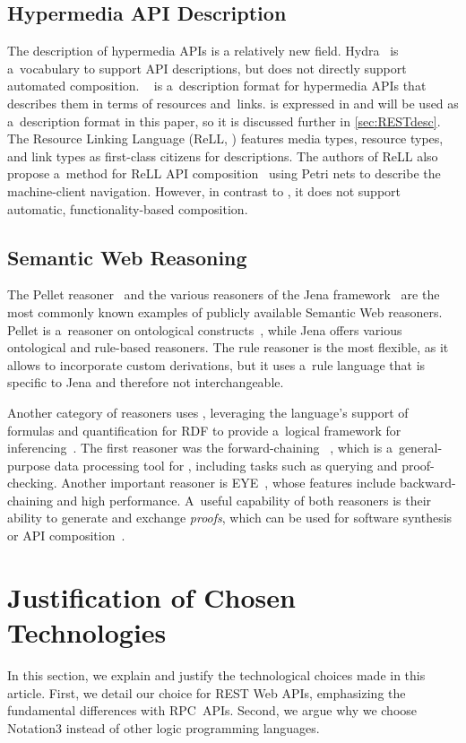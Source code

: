 \subsection{Hypermedia API Description}
The description of hypermedia APIs is a relatively new field.
Hydra~\cite{HydraVocabulary} is a~vocabulary to support API descriptions,
but does not directly support automated composition.
\restdesc~\cite{verborgh_wsrest_2012}
is a~description format
for hypermedia APIs that describes them in terms of resources and~links.
\restdesc is expressed in \nthree
and will be used as a~description format in this paper,
so it is discussed further in \cref{sec:RESTdesc}.
The Resource Linking Language (ReLL, \cite{ReLL}) features media types, resource types, and link types as first-class citizens for descriptions.
The authors of ReLL also propose a~method
for ReLL API composition~\cite{ReLLComposition}
using Petri nets to describe the machine-client navigation.
However, in contrast to \restdesc, it does not support
automatic, functionality-based composition.

\subsection{Semantic Web Reasoning}
\label{subsec:RelatedReasoning}
The Pellet reasoner~\cite{Pellet} and the various reasoners of the Jena framework~\cite{Jena}
are the most commonly known examples of publicly available Semantic Web reasoners.
Pellet is a~reasoner on ontological constructs~\cite{OWL},
while Jena offers various ontological and rule-based reasoners.
The rule reasoner is the most flexible,
as it allows to incorporate custom derivations,
but it uses a~rule language that is specific to Jena and therefore not interchangeable.

Another category of reasoners uses \nthree,
leveraging the language's support of formulas and quantification for RDF
to provide a~logical framework for inferencing~\cite{N3Logic}.
The first \nthree reasoner was the forward-chaining \cwm~\cite{cwm},
which is a~general-purpose data processing tool for \rdf,
including tasks such as querying and proof-checking.
Another important \nthree reasoner is EYE~\cite{eyepaper},
whose features include backward-chaining and high performance.
A~useful capability of both \nthree reasoners
is their ability to generate and exchange \emph{proofs},
which can be used for software synthesis or API composition~\cite{Manna,Waldinger}.


\section{Justification of Chosen Technologies}
\label{sec:Technologies}
In this section, we explain and justify the technological choices made in this article.
First, we detail our choice for REST Web APIs, emphasizing the fundamental differences with RPC~APIs.
Second, we argue why we choose Notation3 instead of other logic programming languages.

